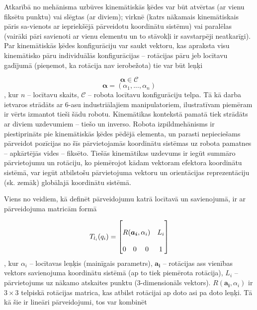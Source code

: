 \documentclass[12pt, a4paper]{article}
\numberwithin{equation}{section} %
\begin{document}
Atkarībā no mehānisma uzbūves kinemātiskās ķēdes var būt atvērtas (ar vienu fiksētu punktu) vai slēgtas (ar diviem); virknē (katrs nākamais kinemātiskais pāris sa-vienots ar iepriekšējā pārveidotu koordinātu sistēmu) vai paralēlas (vairāki pāri savienoti ar vienu elementu un to stāvokļi ir savstarpēji neatkarīgi). Par kinemātiskās ķēdes konfigurāciju var saukt vektoru, kas apraksta visu kinemātisko pāru individuālās konfigurācijas -- rotācijas pāru jeb locītavu gadījumā (pieņemot, ka rotācija nav ierobežota) tie var būt leņķi


\begin{equation}
    \boldsymbol{\alpha} \in \mathcal{C}
\end{equation}
\begin{equation}
    \boldsymbol{\alpha} = (\alpha_1, ..., \alpha_n)
\end{equation}
, kur $n$ -- locītavu skaits, $\mathcal{C}$ -- robota locītavu konfigurāciju telpa. Tā kā darba ietvaros strādāts ar 6-asu industriālajiem manipulatoriem, ilustratīvam piemēram ir vērts izmantot tieši šādu robotu. Kinemātikas kontekstā pamatā tiek strādāts ar diviem uzdevumiem -- tiešo un inverso. Robota izpildmehānisms ir piestiprināts pie kinemātiskās ķēdes pēdējā elementa, un parasti nepieciešams pārveidot pozīcijas no šīs pārvietojamās koordinātu sistēmas uz robota pamatnes -- apkārtējās vides -- fiksēto. Tiešās kinemātikas uzdevums ir iegūt summāro pārvietojumu un rotāciju, ko piemērojot kādam vektoram efektora koordinātu sistēmā, var iegūt atbilstošu pārvietojuma vektoru un orientācijas reprezentāciju (sk. zemāk) globālajā koordinātu sistēmā. 

Viens no veidiem, kā definēt pārveidojumu katrā locītavā un savienojumā, ir ar pārveidojuma matricām formā

\begin{equation}
    T_{l_i}(q_i) =
    \begin{bmatrix}
        \multicolumn{3}{c}{\multirow{3}{*}{$R(\boldsymbol{a_i},\alpha_i)$}} & \multirow{3}{*}{$L_i$} \\
        \multicolumn{3}{c}{} & \multirow{3}{*}{} \\
        \multicolumn{3}{c}{} & \multirow{3}{*}{} \\
        0 & 0 & 0 & 1
    \end{bmatrix}
\end{equation}
, kur $\alpha_i$ -- locītavas leņķis (mainīgais parametrs), $\boldsymbol{a_i}$ -- rotācijas ass vienības vektors savienojuma koordinātu sistēmā (ap to tiek piemērota rotācija), $L_i$ -- pārvietojums uz nākamo atskaites punktu (3-dimensionāls vektors). $R(\boldsymbol{a_i},\alpha_i)$ ir $3 \times 3$ telpiskā rotācijas matrica, kas atbilst rotācijai ap doto asi pa doto leņķi. Tā kā šie ir lineāri pārveidojumi, tos var kombinēt
\end{document}
